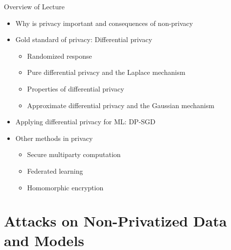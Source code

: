 \documentclass[12pt,aspectratio=169]{beamer}
\begin{document}
\begin{frame}{Overview of Lecture}

\begin{itemize}
    \item Why is privacy important and consequences of non-privacy
    \item Gold standard of privacy: Differential privacy
    \begin{itemize}
        \item Randomized response
        \item Pure differential privacy and the Laplace mechanism
        \item Properties of differential privacy
        \item Approximate differential privacy and the Gaussian mechanism
    \end{itemize}
    \item Applying differential privacy for ML: DP-SGD
    \item Other methods in privacy
    \begin{itemize}
        \item Secure multiparty computation
        \item Federated learning
        \item Homomorphic encryption
    \end{itemize}
\end{itemize}

\end{frame}


\section{Attacks on Non-Privatized Data and Models}
\end{document}
